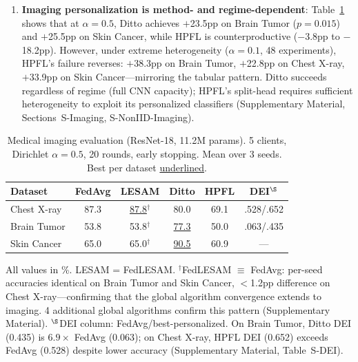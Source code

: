 \documentclass[conference]{IEEEtran}
\begin{document}
\begin{enumerate}
    \item \textbf{Imaging personalization is method- and regime-dependent}: Table~\ref{tab:imaging_main} shows that at $\alpha{=}0.5$, Ditto achieves $+$23.5pp on Brain Tumor ($p{=}0.015$) and $+$25.5pp on Skin Cancer, while HPFL is counterproductive ($-$3.8pp to $-$18.2pp). However, under extreme heterogeneity ($\alpha{=}0.1$, 48 experiments), HPFL's failure reverses: $+$38.3pp on Brain Tumor, $+$22.8pp on Chest X-ray, $+$33.9pp on Skin Cancer---mirroring the tabular pattern. Ditto succeeds regardless of regime (full CNN capacity); HPFL's split-head requires sufficient heterogeneity to exploit its personalized classifiers (Supplementary Material, Sections~S-Imaging, S-NonIID-Imaging).
\end{enumerate}

\begin{table}[htbp]
\centering
\caption{Medical imaging evaluation (ResNet-18, 11.2M params). 5 clients, Dirichlet $\alpha{=}0.5$, 20 rounds, early stopping. Mean over 3 seeds. Best per dataset \underline{underlined}.}
\label{tab:imaging_main}
\small
\setlength{\tabcolsep}{4pt}
\begin{tabular}{@{}lccccc@{}}
\toprule
\textbf{Dataset} & \textbf{FedAvg} & \textbf{LESAM} & \textbf{Ditto} & \textbf{HPFL} & \textbf{DEI$^\S$} \\
\midrule
Chest X-ray & 87.3 & \underline{87.8}$^\dagger$ & 80.0 & 69.1 & .528/.652 \\
Brain Tumor & 53.8 & 53.8$^\dagger$ & \underline{77.3} & 50.0 & .063/.435 \\
Skin Cancer & 65.0 & 65.0$^\dagger$ & \underline{90.5} & 60.9 & --- \\
\bottomrule
\end{tabular}

\vspace{1mm}
\begin{minipage}{\columnwidth}
\raggedright\footnotesize
All values in \%. LESAM = FedLESAM. $^\dagger$FedLESAM $\equiv$ FedAvg: per-seed accuracies identical on Brain Tumor and Skin Cancer, $<$1.2pp difference on Chest X-ray---confirming that the global algorithm convergence extends to imaging. 4 additional global algorithms confirm this pattern (Supplementary Material). $^\S$DEI column: FedAvg/best-personalized. On Brain Tumor, Ditto DEI (0.435) is $6.9\times$ FedAvg (0.063); on Chest X-ray, HPFL DEI (0.652) exceeds FedAvg (0.528) despite lower accuracy (Supplementary Material, Table~S-DEI).
\end{minipage}
\end{table}
\end{document}
